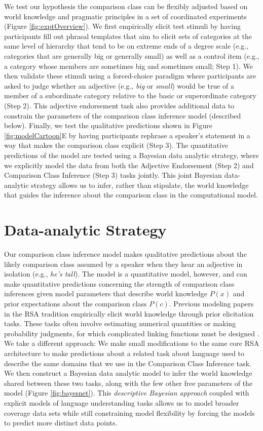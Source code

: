 \documentclass[doc]{apa6}
\begin{document}
We test our hypothesis the comparison class can be flexibly adjusted based on world knowledge and pragmatic principles in a set of coordinated experiments (Figure \ref{fig:exptOverview}).
We first empirically elicit test stimuli by having participants fill out phrasal templates that aim to elicit sets of categories at the same level of hierarchy that tend to be on extreme ends of a degree scale (e.g., categories that are generally big or generally small) as well as a control item (e.g., a category whose members are sometimes big and sometimes small; Step 1). 
We then validate these stimuli using a forced-choice paradigm where participants are asked to judge whether an adjective (e.g., \emph{big} or \emph{small}) would be true of a member of a subordinate category relative to the basic or superordinate category (Step 2). 
This adjective endorsement task also provides additional data to constrain the parameters of the comparison class inference model (described below).
Finally, we test the qualitative predictions shown in Figure \ref{fig:modelCartoon}E by having participants rephrase a speaker's statement in a way that makes the comparison class explicit (Step 3).
The quantitative predictions of the model are tested using a Bayesian data analytic strategy, where we explicitly model the data from both the Adjective Endorsement (Step 2) and Comparison Class Inference (Step 3) tasks jointly.
This joint Bayesian data-analytic strategy allows us to infer, rather than stipulate, the world knowledge that guides the inference about the comparison class in the computational model. 

\section{Data-analytic Strategy}

Our comparison class inference model makes qualitative predictions about the likely comparison class assumed by a speaker when they hear an adjective in isolation (e.g., \emph{he's tall}). 
The model is a quantitative model, however, and can make quantitative predictions concerning the strength of comparison class inferences given model parameters that describe world knowledge $P(x)$ and prior expectations about the comparison class $P(c)$.
Previous modeling papers in the RSA tradition empirically elicit world knowledge through prior elicitation tasks.
These tasks often involve estimating numerical quantities or making probability judgments, for which complicated linking functions must be designed \cite{Franke2016}. 
We take a different approach: We make small modifications to the same core RSA architecture to make predictions about a related task about language used to describe the same domains that we use in the Comparison Class Inference task. 
We then construct a Bayesian data analytic model to infer the world knowledge shared between these two tasks, along with the few other free parameters of the model (Figure \ref{fig:bayesnet}). 
This \emph{descriptive Bayesian approach} \cite{tauber2017} coupled with explicit models of language understanding tasks allows us to model broader coverage data sets while still constraining model flexibility by forcing the models to predict more distinct data points. 
\end{document}
